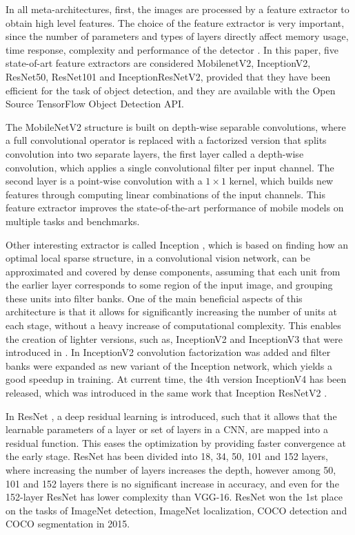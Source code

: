\documentclass[journal]{IEEEtran}
\begin{document}
In all meta-architectures, first, the images are processed by a feature extractor to obtain high level features. The choice of the feature extractor is very important, since the number of parameters and types of layers directly affect memory usage, time response, complexity and performance of the detector \cite{huang2017speed}. In this paper, five state-of-art feature extractors are considered MobilenetV2, InceptionV2, ResNet50, ResNet101 and InceptionResNetV2, provided that they have been efficient for the task of object detection, and they are available with the Open Source TensorFlow Object Detection API. 

The MobileNetV2 \cite{sandler2018mobilenetv2} structure is built on depth-wise separable convolutions, where a full convolutional operator is replaced with a factorized version that splits convolution into two separate layers, the first layer called a depth-wise convolution, which applies a single convolutional filter per input channel. The second layer is a point-wise convolution with a $1\times1$ kernel, which builds new features through computing linear combinations of the input channels. This feature extractor improves the state-of-the-art performance of mobile models on multiple tasks and benchmarks.

Other interesting extractor is called Inception \cite{szegedy2015going}, which is based on finding how an optimal local sparse structure, in a convolutional vision network, can be approximated and covered by dense components, assuming that each unit from the earlier layer corresponds to some region of the input image, and grouping these units into filter banks. One of the main beneficial aspects of this architecture is that it allows for significantly increasing the number of units at each stage, without a heavy increase of computational complexity. This enables the creation of lighter versions, such as, InceptionV2 and InceptionV3 that were introduced in \cite{szegedy2016re}. In InceptionV2 convolution factorization was added and filter banks were expanded as new variant of the Inception network, which yields a good speedup in training. At current time, the 4th version InceptionV4 has been released, which was introduced in the same work that Inception ResNetV2 \cite{szegedy2017inception}.

In ResNet \cite{he2016deep}, a deep residual learning is introduced, such that it allows that the learnable parameters of a layer or set of layers in a CNN, are mapped into a residual function. This eases the optimization by providing faster convergence at the early stage. ResNet has been divided into 18, 34, 50, 101 and 152 layers, where increasing the number of layers increases the depth, however among 50, 101 and 152 layers there is no significant increase in accuracy, and even for the 152-layer ResNet has lower complexity than VGG-16. ResNet won the 1st place on the tasks of ImageNet detection, ImageNet localization, COCO detection and COCO segmentation in 2015.
\end{document}
